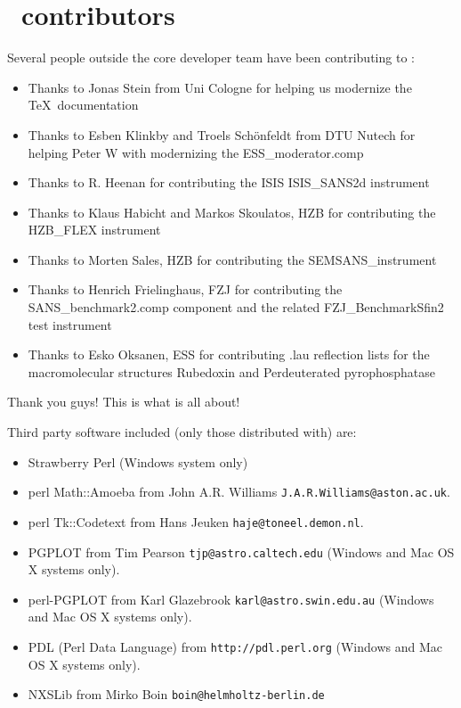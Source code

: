 \section*{\MCS \version\ contributors}
Several people outside the core developer team have been contributing
to \MCS \version:
\begin{itemize}
\item Thanks to Jonas Stein from Uni Cologne for helping us modernize the \TeX\ documentation
\item Thanks to Esben Klinkby and Troels Sch\"onfeldt from DTU Nutech for helping
  Peter W  with modernizing the ESS\_moderator.comp
\item Thanks to R. Heenan for contributing the ISIS ISIS\_SANS2d instrument 
\item Thanks to Klaus Habicht and Markos Skoulatos, HZB for
  contributing the HZB\_FLEX instrument
\item Thanks to Morten Sales, HZB  for contributing the SEMSANS\_instrument
\item Thanks to Henrich Frielinghaus, FZJ for contributing the
  SANS\_benchmark2.comp component and the related FZJ\_BenchmarkSfin2
  test instrument
\item Thanks to Esko Oksanen, ESS for contributing .lau reflection
  lists for the macromolecular structures Rubedoxin and Perdeuterated pyrophosphatase
\end{itemize}
Thank you guys! This is what \MCS is all about!

Third party software included (only those distributed with) \MCS are:
\begin{itemize}
\item Strawberry Perl (Windows system only)
\item perl Math::Amoeba from John A.R. Williams \verb+J.A.R.Williams@aston.ac.uk+.
\item perl Tk::Codetext from Hans Jeuken \verb+haje@toneel.demon.nl+.
\item PGPLOT from Tim Pearson \verb+tjp@astro.caltech.edu+ (Windows
  and Mac OS X systems only).
\item perl-PGPLOT from Karl Glazebrook \verb+karl@astro.swin.edu.au+ (Windows
  and Mac OS X systems only).
\item PDL (Perl Data Language) from \verb+http://pdl.perl.org+ (Windows
  and Mac OS X systems only).
\item NXSLib from Mirko Boin \verb+boin@helmholtz-berlin.de+
\end{itemize}

